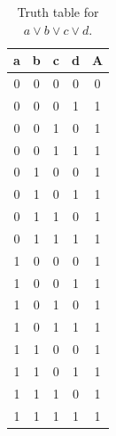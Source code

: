 \begin{table}[!tb]
    \centering
    \begin{tabular}{|c|c|c|c|c|}
        \hline
        \textbf{a} & \textbf{b} & \textbf{c} & \textbf{d} & \textbf{A} \\ \hline
        0 & 0 & 0 & 0 & 0 \\ \hline
        0 & 0 & 0 & 1 & 1 \\ \hline
        0 & 0 & 1 & 0 & 1 \\ \hline
        0 & 0 & 1 & 1 & 1 \\ \hline
        0 & 1 & 0 & 0 & 1 \\ \hline
        0 & 1 & 0 & 1 & 1 \\ \hline
        0 & 1 & 1 & 0 & 1 \\ \hline
        0 & 1 & 1 & 1 & 1 \\ \hline
        1 & 0 & 0 & 0 & 1 \\ \hline
        1 & 0 & 0 & 1 & 1 \\ \hline
        1 & 0 & 1 & 0 & 1 \\ \hline
        1 & 0 & 1 & 1 & 1 \\ \hline
        1 & 1 & 0 & 0 & 1 \\ \hline
        1 & 1 & 0 & 1 & 1 \\ \hline
        1 & 1 & 1 & 0 & 1 \\ \hline
        1 & 1 & 1 & 1 & 1 \\ \hline
    \end{tabular}
    \caption{Truth table for $a \lor b \lor c \lor d$.}
    \label{tab:truthtab}
\end{table}

